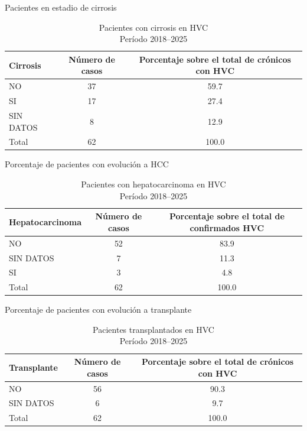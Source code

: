 \documentclass[
  letterpaper,
  DIV=11,
  numbers=noendperiod]{scrartcl}
\begin{document}
Pacientes en estadio de cirrosis

\begin{table}
\caption*{
{\fontsize{20}{25}\selectfont  Pacientes con cirrosis en HVC\fontsize{12}{15}\selectfont } \\ 
{\fontsize{14}{17}\selectfont  Período 2018–2025\fontsize{12}{15}\selectfont }
} 
\fontsize{12.0pt}{14.0pt}\selectfont
\begin{tabular*}{\linewidth}{@{\extracolsep{\fill}}lcc}
\toprule
Cirrosis  & Número de casos & Porcentaje sobre el total de crónicos con HVC \\ 
\midrule\addlinespace[2.5pt]
NO & 37 & 59.7 \\ 
SI & 17 & 27.4 \\ 
SIN DATOS & 8 & 12.9 \\ 
Total & 62 & 100.0 \\ 
\bottomrule
\end{tabular*}
\end{table}

Porcentaje de pacientes con evolución a HCC

\begin{table}
\caption*{
{\fontsize{20}{25}\selectfont  Pacientes con hepatocarcinoma en HVC\fontsize{12}{15}\selectfont } \\ 
{\fontsize{14}{17}\selectfont  Período 2018–2025\fontsize{12}{15}\selectfont }
} 
\fontsize{12.0pt}{14.0pt}\selectfont
\begin{tabular*}{\linewidth}{@{\extracolsep{\fill}}lcc}
\toprule
Hepatocarcinoma  & Número de casos & Porcentaje sobre el total de confirmados HVC \\ 
\midrule\addlinespace[2.5pt]
NO & 52 & 83.9 \\ 
SIN DATOS & 7 & 11.3 \\ 
SI & 3 & 4.8 \\ 
Total & 62 & 100.0 \\ 
\bottomrule
\end{tabular*}
\end{table}

Porcentaje de pacientes con evolución a transplante

\begin{table}
\caption*{
{\fontsize{20}{25}\selectfont  Pacientes transplantados en HVC\fontsize{12}{15}\selectfont } \\ 
{\fontsize{14}{17}\selectfont  Período 2018–2025\fontsize{12}{15}\selectfont }
} 
\fontsize{12.0pt}{14.0pt}\selectfont
\begin{tabular*}{\linewidth}{@{\extracolsep{\fill}}lcc}
\toprule
Transplante  & Número de casos & Porcentaje sobre el total de crónicos con HVC \\ 
\midrule\addlinespace[2.5pt]
NO & 56 & 90.3 \\ 
SIN DATOS & 6 & 9.7 \\ 
Total & 62 & 100.0 \\ 
\bottomrule
\end{tabular*}
\end{table}
\end{document}
